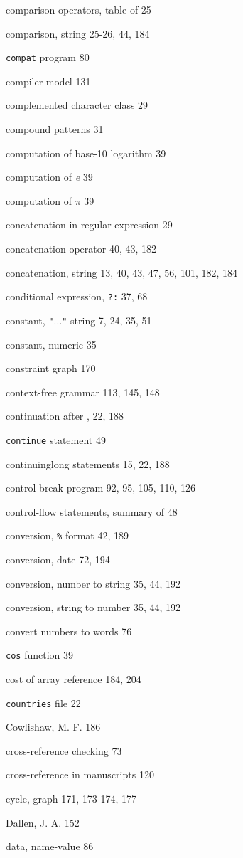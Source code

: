 \begin{multicols}{3}
comparison operators, table of 25

comparison, string 25-26, 44, 184

\verb'compat' program 80

compiler model 131

complemented character class 29

compound patterns 31

computation of base-10 logarithm 39

computation of \textit{e} 39

computation of $\pi$ 39

concatenation in regular expression 29

concatenation operator 40, 43, 182

concatenation, string 13, 40, 43, 47, 56, 101, 182, 184

conditional expression, \verb'?:' 37, 68

constant, \verb'"'...\verb'"' string 7, 24, 35, 51

constant, numeric 35

constraint graph 170

context-free grammar 113, 145, 148

continuation after , 22, 188

\verb'continue' statement 49

continuinglong statements 15, 22, 188

control-break program 92, 95, 105, 110, 126

control-flow statements, summary of 48

conversion, \verb'%' format 42, 189

conversion, date 72, 194

conversion, number to string 35, 44, 192

conversion, string to number 35, 44, 192

convert numbers to words 76

\verb'cos' function 39

cost of array reference 184, 204

\verb'countries' file 22

Cowlishaw, M. F. 186

cross-reference checking 73

cross-reference in manuscripts 120

cycle, graph 171, 173-174, 177

Dallen, J. A. 152

data, name-value 86


\end{multicols}
